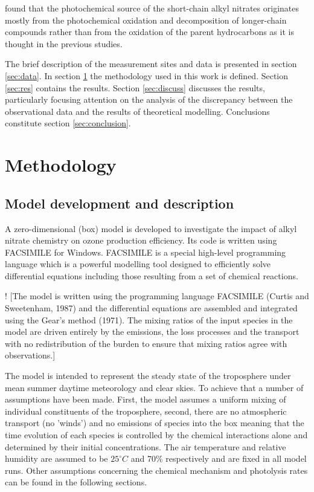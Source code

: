\documentclass[11pt,a4paper]{article}
\begin{document}
\cite{Worton2010} found that the photochemical source of the short-chain alkyl nitrates originates mostly from the photochemical oxidation and decomposition of longer-chain compounds rather than from the oxidation of the parent hydrocarbons as it is thought in the previous studies.

The brief description of the measurement sites and data is presented in section \ref{sec:data}. In section \ref{sec:method} the methodology used in this work is defined. Section \ref{sec:res} contains the results. Section \ref{sec:discuss} discusses the results, particularly focusing attention on the analysis of the discrepancy between the observational data and the results of theoretical modelling. Conclusions constitute section \ref{sec:conclusion}.

\section{Methodology} \label{sec:method}
\subsection{Model development and description}
A zero-dimensional (box) model is developed to investigate the impact of alkyl nitrate chemistry on ozone production efficiency. Its code is written using FACSIMILE for Windows. FACSIMILE is a special high-level programming language which is a powerful modelling tool designed to efficiently solve differential equations including those resulting from a set of chemical reactions.

! \citep{Newland2013}
[The model is written using the programming language FACSIMILE (Curtis and Sweetenham, 1987) and the differential equations are assembled and integrated using the Gear’s method (1971). The mixing ratios of the input species in the model are driven entirely by the emissions, the loss processes and the transport with no redistribution of the burden to ensure that mixing ratios agree with observations.]

The model is intended to represent the steady state of the troposphere under mean summer daytime meteorology and clear skies. To achieve that a number of assumptions have been made. First, the model assumes a uniform mixing of individual constituents of the troposphere, second, there are no atmospheric transport (no 'winds') and no emissions of species into the box meaning that the time evolution of each species is controlled by the chemical interactions alone and determined by their initial concentrations. The air temperature and relative humidity are assumed to be $25^{\circ}C$ and 70\% respectively and are fixed in all model runs. Other assumptions concerning the chemical mechanism and photolysis rates can be found in the following sections.
\end{document}
